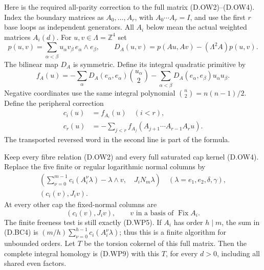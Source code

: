 Here is the required all-parity correction to the
full matrix (D.OW2)--(D.OW4). Index the boundary
matrices as $A_0,\ldots,A_r$, with
$A_0\cdots A_r=I$, and use the first $r$ base loops
as independent generators. All $A_i$ below mean
the actual weighted matrices $A_i(d)$.
For $u,v\in\Lambda=\mathbb Z^4$ set
\[
 p(u,v)=\sum_{\alpha<\beta}u_\alpha v_\beta\,
                  e_\alpha\wedge e_\beta,\qquad
 D_A(u,v)=p(Au,Av)-(\Lambda^2A)p(u,v).
                                                        \tag{D.BC1}
\]
The bilinear map $D_A$ is symmetric. Define its
integral quadratic primitive by
\[
 f_A(u)=-\sum_\alpha D_A(e_\alpha,e_\alpha)
                       {u_\alpha\choose2}
        -\sum_{\alpha<\beta}D_A(e_\alpha,e_\beta)
                       u_\alpha u_\beta .
                                                        \tag{D.BC2}
\]
Negative coordinates use the same integral polynomial
$\binom n2=n(n-1)/2$.
Define the peripheral correction
\[
 \begin{split}
 c_i(u)&=f_{A_i}(u) \quad (i<r),\\
 c_r(u)&=-\sum_{j<r}
       f_{A_j}(A_{j+1}\cdots A_{r-1}A_r u).
 \end{split}                                            \tag{D.BC3}
\]
The transported reversed word in the second line
is part of the formula.

Keep every fibre relation (D.OW2) and every full
saturated cap kernel (D.OW4). Replace the five
finite or regular logarithmic normal columns by
\[
 \begin{gathered}
 \left(\sum_{\nu=0}^{m-1}c_i(A_i^\nu\lambda)
                  -\lambda\wedge v,\quad J_iN_m\lambda\right)
       \quad(\lambda=e_1,e_2,\delta,\gamma),\\
                       (c_i(v),J_iv).
 \end{gathered}                                          \tag{D.BC4}
\]
At every other cap the fixed-normal columns are
\[
                         (c_i(v),J_iv),
                         \qquad v\text{ in a basis of }\operatorname{Fix} A_i.
                                                        \tag{D.BC5}
\]
The finite freeness test is still exactly (D.WP5).
If $A_i$ has order $h\mid m$, the sum in (D.BC4)
is $(m/h)\sum_{\nu=0}^{h-1}c_i(A_i^\nu\lambda)$;
thus this is a finite algorithm for unbounded orders.
Let $T$ be the torsion cokernel of this full matrix.
Then the complete integral homology is (D.WP9)
with this $T$, for every $d>0$, including all
shared even factors.


